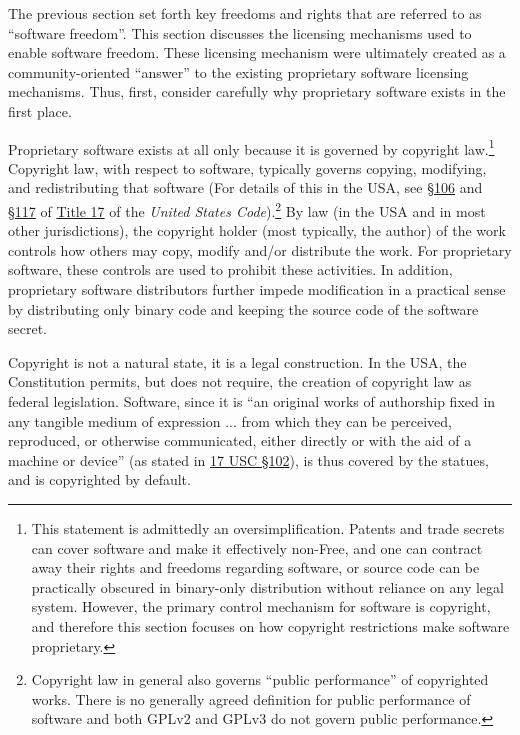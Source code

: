 The previous section set forth key freedoms and rights that are referred to
as ``software freedom''.  This section discusses the licensing mechanisms
used to enable software freedom.  These licensing mechanism were ultimately
created as a community-oriented ``answer'' to the existing proprietary
software licensing mechanisms.  Thus, first, consider carefully why
proprietary software exists in the first place.

Proprietary software exists at all only because it is governed by copyright
law.\footnote{This statement is admittedly an oversimplification. Patents and
  trade secrets can cover software and make it effectively non-Free, and one
  can contract away their rights and freedoms regarding software, or source
  code can be practically obscured in binary-only distribution without
  reliance on any legal system.  However, the primary control mechanism for
  software is copyright, and therefore this section focuses on how copyright
  restrictions make software proprietary.} Copyright law, with respect to
software, typically governs copying, modifying, and redistributing that
software (For details of this in the USA, see
\href{http://www.copyright.gov/title17/92chap1.html#106}{\S 106} and
\href{http://www.copyright.gov/title17/92chap1.html#117}{\S 117} of
\href{http://www.law.cornell.edu/uscode/text/17}{Title 17} of the
\textit{United States Code}).\footnote{Copyright law in general also governs
  ``public performance'' of copyrighted works. There is no generally agreed
  definition for public performance of software and both GPLv2 and GPLv3 do
  not govern public performance.} By law (in the USA and in most other
jurisdictions), the copyright holder (most typically, the author) of the work controls
how others may copy, modify and/or distribute the work. For proprietary
software, these controls are used to prohibit these activities. In addition,
proprietary software distributors further impede modification in a practical
sense by distributing only binary code and keeping the source code of the
software secret.

Copyright is not a natural state, it is a legal construction. In the USA, the
Constitution permits, but does not require, the creation of copyright law as
federal legislation.  Software, since it is ``an original works of authorship
fixed in any tangible medium of expression ...  from which they can be
perceived, reproduced, or otherwise communicated, either directly or with the
aid of a machine or device'' (as stated in
\href{http://www.law.cornell.edu/uscode/text/17/102}{17 USC \S 102}), is thus
covered by the statues, and is copyrighted by default.

